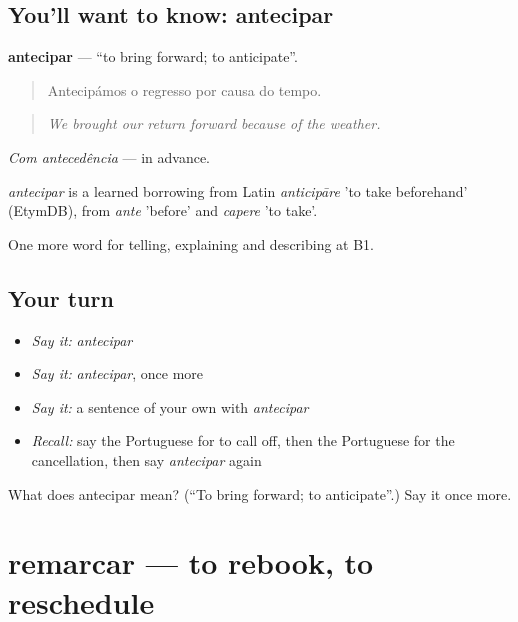 \subsection*{You'll want to know: antecipar}
\textbf{antecipar} — \textquotedblleft{}to bring forward; to anticipate\textquotedblright{}.

\begin{quote}
Antecipámos o regresso por causa do tempo.
\end{quote}

\begin{quote}
\emph{We brought our return forward because of the weather.}
\end{quote}

\emph{Com antecedência} — in advance.

\begin{cousinweb}
\emph{antecipar} is a learned borrowing from Latin \emph{anticipāre} 'to take beforehand' (EtymDB), from \emph{ante} 'before' and \emph{capere} 'to take'.
\end{cousinweb}

\begin{grammarlens}[title={What you've built}]
One more word for telling, explaining and describing at B1.
\end{grammarlens}

\subsection*{Your turn}
\begin{itemize}
\raggedright
  \item \emph{Say it:} \emph{antecipar}
  \item \emph{Say it:} \emph{antecipar}, once more
  \item \emph{Say it:} a sentence of your own with \emph{antecipar}
  \item \emph{Recall:} say the Portuguese for to call off, then the Portuguese for the cancellation, then say \emph{antecipar} again
\end{itemize}

\begin{tcolorbox}[breakable,colback=teal!4,colframe=teal!35!black,title={Before you move on}]
What does antecipar mean? (\textquotedblleft{}To bring forward; to anticipate\textquotedblright{}.) Say it once more.
\end{tcolorbox}
\section[remarcar]{remarcar — to rebook, to reschedule}

